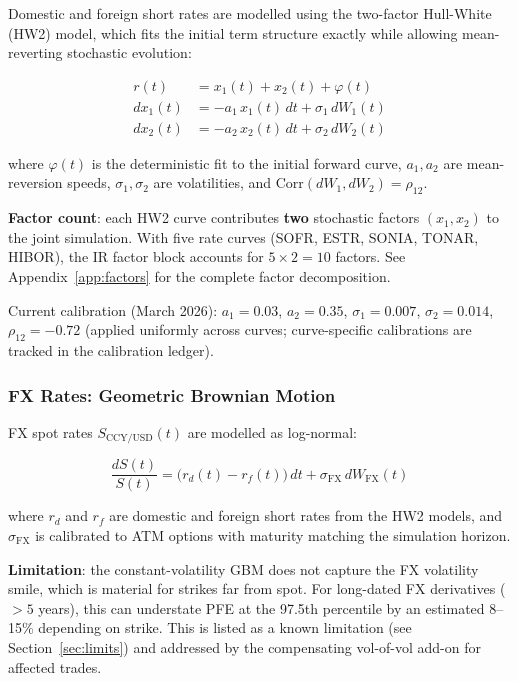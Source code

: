 \documentclass[11pt,a4paper]{article}
\begin{document}
Domestic and foreign short rates are modelled using the two-factor Hull-White
(HW2) model, which fits the initial term structure exactly while allowing
mean-reverting stochastic evolution:

\begin{align}
  r(t) &= x_1(t) + x_2(t) + \varphi(t) \label{eq:hw2_r}\\
  dx_1(t) &= -a_1\, x_1(t)\, dt + \sigma_1\, dW_1(t) \label{eq:hw2_x1}\\
  dx_2(t) &= -a_2\, x_2(t)\, dt + \sigma_2\, dW_2(t) \label{eq:hw2_x2}
\end{align}

where $\varphi(t)$ is the deterministic fit to the initial forward curve,
$a_1, a_2$ are mean-reversion speeds, $\sigma_1, \sigma_2$ are volatilities,
and $\text{Corr}(dW_1, dW_2) = \rho_{12}$.

\textbf{Factor count}: each HW2 curve contributes \textbf{two} stochastic
factors $(x_1, x_2)$ to the joint simulation. With five rate curves (SOFR,
ESTR, SONIA, TONAR, HIBOR), the IR factor block accounts for
$5 \times 2 = 10$ factors. See Appendix~\ref{app:factors} for the complete
factor decomposition.

Current calibration (March 2026):
$a_1 = 0.03$, $a_2 = 0.35$, $\sigma_1 = 0.007$, $\sigma_2 = 0.014$,
$\rho_{12} = -0.72$ (applied uniformly across curves; curve-specific calibrations
are tracked in the calibration ledger).

\subsubsection{FX Rates: Geometric Brownian Motion}

FX spot rates $S_{\text{CCY/USD}}(t)$ are modelled as log-normal:

\begin{equation}
  \frac{dS(t)}{S(t)} = \bigl(r_d(t) - r_f(t)\bigr)\, dt + \sigma_{\text{FX}}\, dW_{\text{FX}}(t)
  \label{eq:fx_gbm}
\end{equation}

where $r_d$ and $r_f$ are domestic and foreign short rates from the HW2 models,
and $\sigma_{\text{FX}}$ is calibrated to ATM options with maturity matching
the simulation horizon.

\textbf{Limitation}: the constant-volatility GBM does not capture the FX
volatility smile, which is material for strikes far from spot. For long-dated
FX derivatives ($>5$ years), this can understate PFE at the 97.5th percentile
by an estimated 8--15\% depending on strike. This is listed as a known
limitation (see Section~\ref{sec:limits}) and addressed by the compensating
vol-of-vol add-on for affected trades.
\end{document}
